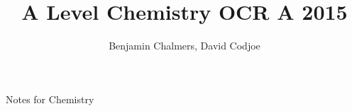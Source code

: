 \documentclass[11pt,a4paper]{memoir}
\author{Benjamin Chalmers, David Codjoe}
\title{A Level Chemistry OCR A 2015}
\begin{document}
\frontmatter
\maketitle
\newpage

Notes for Chemistry
	
\newpage
\tableofcontents
\mainmatter


	

	







\end{document}
